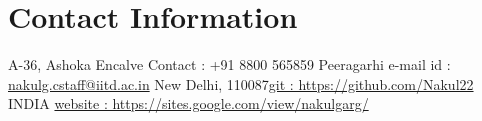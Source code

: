 \newenvironment{outerlist}[1][\enskip\textbullet]%
        {\begin{itemize}[#1,leftmargin=*]}{\end{itemize}%
         \vspace{-.6\baselineskip}}

\newenvironment{lonelist}[1][\enskip\textbullet]%
        {\begin{list}{#1}{%
        \setlength{\partopsep}{0pt}%
        \setlength{\topsep}{0pt}}}
        {\end{list}\vspace{-.6\baselineskip}}

\newenvironment{innerlist}[1][\enskip\textbullet]%
        {\begin{itemize}[#1,leftmargin=*,parsep=0pt,itemsep=0pt,topsep=0pt,partopsep=0pt]}
        {\end{itemize}}

\newenvironment{loneinnerlist}[1][\enskip\textbullet]%
        {\begin{itemize}[#1,leftmargin=*,parsep=0pt,itemsep=0pt,topsep=0pt,partopsep=0pt]}
        {\end{itemize}\vspace{-.6\baselineskip}}

\newcommand{\blankline}{\quad\pagebreak[3]}
\newcommand{\halfblankline}{\quad\vspace{-0.5\baselineskip}\pagebreak[3]}

\newcommand\doilink[1]{\href{http://dx.doi.org/#1}{#1}}
\newcommand\doi[1]{doi:\doilink{#1}}

\providecommand*\url[1]{\href{#1}{#1}}
\renewcommand*\url[1]{\href{#1}{\texttt{#1}}}
\providecommand*\email[1]{\href{mailto:#1}{#1}}

\providecommand\BibTeX{{B\kern-.05em{\sc i\kern-.025em b}\kern-.08em
    \TeX}}
\providecommand\Matlab{\textsc{Matlab}}




\section{Contact Information}

\newlength{\rcollength}\setlength{\rcollength}{1.4in}%


A-36, Ashoka Encalve  \hfill {Contact : +91 8800 565859} \newline
Peeragarhi \hfill {e-mail id : \email{nakulg.cstaff@iitd.ac.in}} \newline
New Delhi, 110087\hfill  \href{https://github.com/Nakul22}{git : https://github.com/Nakul22} \newline
INDIA \hfill \href{https://sites.google.com/view/nakulgarg/}{website : https://sites.google.com/view/nakulgarg/}


